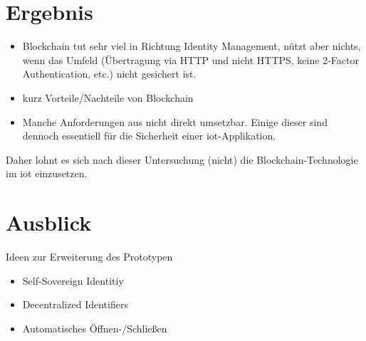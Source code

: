 \section{Ergebnis}
\label{sec:end}
    \begin{itemize}
        \item Blockchain tut sehr viel in Richtung Identity Management, nützt aber nichts, wenn das Umfeld (Übertragung via HTTP und nicht HTTPS, keine 2-Factor Authentication, etc.) nicht gesichert ist.
        \item kurz Vorteile/Nachteile von Blockchain
        \item Manche Anforderungen aus  nicht direkt umsetzbar.
            Einige dieser sind dennoch essentiell für die Sicherheit einer \gls{iot}-Applikation.
    \end{itemize}
    
    Daher lohnt es sich nach dieser Untersuchung (nicht) die Blockchain-Technologie im \gls{iot} einzusetzen.
    
    
\section{Ausblick}
\label{sec:end_further}
	Ideen zur Erweiterung des Prototypen
	\begin{itemize}
		\item Self-Sovereign Identitiy
		\item Decentralized Identifiers
		\item Automatisches Öffnen-/\-Schließen
	\end{itemize}